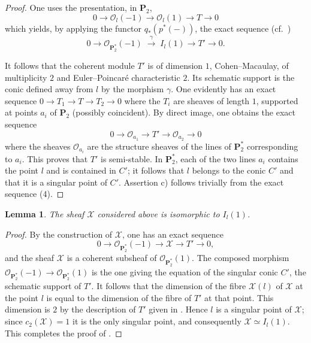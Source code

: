 \documentclass[12pt,english]{smfart}%
\theoremstyle{plain}
\newtheorem{lemma}[theorem]{Lemma}
\theoremstyle{definition}
\theoremstyle{remark}
\newcommand{\PP}{\mathbf{P}}
\newcommand{\Pd}{\PP_{2}^{*}}          %
\newcommand{\Oo}{\mathcal{O}}
\begin{document}
\begin{proof}
One uses the presentation, in $\PP_2$,
\[
0 \longrightarrow \Oo_l(-1)\longrightarrow \Oo_l(1)\longrightarrow T
\longrightarrow 0
\]
which yields, by applying the functor $q_*(p^*(-))$, the exact sequence (cf.\ )
\begin{equation}
0 \longrightarrow \Oo_{\Pd}(-1)\;\xrightarrow{\;\gamma\;}\; I_l(1)
\longrightarrow T'\longrightarrow 0 .
\end{equation}

It follows that the coherent module $T'$ is of dimension $1$, Cohen--Macaulay, of multiplicity $2$ and Euler--Poincar\'e characteristic $2$. Its schematic support is the conic defined away from $l$ by the morphism $\gamma$. One evidently has an exact sequence $0\to T_1\to T\to T_2\to 0$ where the $T_i$ are sheaves of length $1$, supported at points $a_i$ of $\PP_2$ (possibly coincident). By direct image, one obtains the exact sequence
\[
0 \longrightarrow \Oo_{a_1}\longrightarrow T' \longrightarrow \Oo_{a_2}
\longrightarrow 0
\]
where the sheaves $\Oo_{a_i}$ are the structure sheaves of the lines of $\Pd$ corresponding to $a_i$. This proves that $T'$ is semi-stable. In $\Pd$, each of the two lines $a_i$ contains the point $l$ and is contained in $C'$; it follows that $l$ belongs to the conic $C'$ and that it is a singular point of $C'$. Assertion c) follows trivially from the exact sequence (4).
\end{proof}

\begin{lemma}\label{lem:Xcal}
The sheaf $\mathscr{X}$ considered above is isomorphic to $I_l(1)$.
\end{lemma}

\begin{proof}
By the construction of $\mathscr{X}$, one has an exact sequence
\[
0 \longrightarrow \Oo_{\Pd}(-1)\longrightarrow \mathscr{X}\longrightarrow T'
\longrightarrow 0,
\]
and the sheaf $\mathscr{X}$ is a coherent subsheaf of $\Oo_{\Pd}(1)$. The composed morphism $\Oo_{\Pd}(-1)\to\Oo_{\Pd}(1)$ is the one giving the equation of the singular conic $C'$, the schematic support of $T'$. It follows that the dimension of the fibre $\mathscr{X}(l)$ of $\mathscr{X}$ at the point $l$ is equal to the dimension of the fibre of $T'$ at that point. This dimension is $2$ by the description of $T'$ given in . Hence $l$ is a singular point of $\mathscr{X}$; since $c_2(\mathscr{X})=1$ it is the only singular point, and consequently $\mathscr{X}\simeq I_l(1)$. This completes the proof of .
\end{proof}
\end{document}
